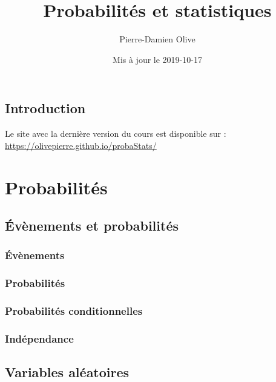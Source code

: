 \documentclass[]{book}
\title{Probabilités et statistiques}
\author{Pierre-Damien Olive}
\date{Mis à jour le 2019-10-17}
\theoremstyle{definition}
\theoremstyle{definition}
\theoremstyle{definition}
\theoremstyle{remark}
\begin{document}
\maketitle

{
\setcounter{tocdepth}{1}
\tableofcontents
}
\hypertarget{introduction}{%
\chapter*{Introduction}\label{introduction}}

Le site avec la dernière version du cours est disponible sur : \url{https://olivepierre.github.io/probaStats/}

\hypertarget{part-probabilituxe9s}{%
\part{Probabilités}\label{part-probabilituxe9s}}

\hypertarget{uxe9vuxe8nements-et-probabilituxe9s}{%
\chapter{Évènements et probabilités}\label{uxe9vuxe8nements-et-probabilituxe9s}}

\hypertarget{uxe9vuxe8nements}{%
\section{Évènements}\label{uxe9vuxe8nements}}

\hypertarget{probabilituxe9s}{%
\section{Probabilités}\label{probabilituxe9s}}

\hypertarget{probabilituxe9s-conditionnelles}{%
\section{Probabilités conditionnelles}\label{probabilituxe9s-conditionnelles}}

\hypertarget{induxe9pendance}{%
\section{Indépendance}\label{induxe9pendance}}

\hypertarget{variables-aluxe9atoires}{%
\chapter{Variables aléatoires}\label{variables-aluxe9atoires}}
\end{document}

